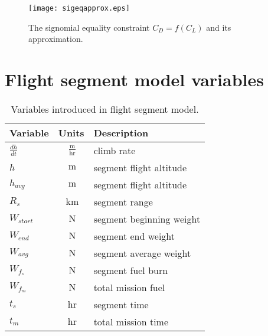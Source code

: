 \begin{figure}[!ht]
\centering
\texttt{[image: sigeqapprox.eps]}
\caption{The signomial equality constraint $C_{D} = f(C_{L})$ and its
approximation.}\label{f:sigeq}
\end{figure}

\section{Flight segment model variables}
\label{a:flightprofilevars}

\begin{footnotesize}
    \begin{table}
        \centering
        \begin{tabular}{l c l}
            \toprule
            Variable & Units & Description \\
            \midrule
            $\frac{dh}{dt}$  & $~\mathrm{\tfrac{m}{hr}}$ & climb rate \\
            $h$ & $~\mathrm{m}$ & segment flight altitude\\
            $h_{avg}$ & $~\mathrm{m}$ & segment flight altitude\\
            $R_s$ & $~\mathrm{km}$ & segment range\\
            $W_{start}$  & $~\mathrm{N}$ & segment beginning weight\\
            $W_{end}$ & $~\mathrm{N}$ & segment end weight\\
            $W_{avg}$ & $~\mathrm{N}$ & segment average weight\\
            $W_{f_s}$ & $~\mathrm{N}$ & segment fuel burn\\
            $W_{f_m}$  & $~\mathrm{N}$ & total mission fuel\\
            $t_s$ & $~\mathrm{hr}$ & segment time\\
            $t_m$  & $~\mathrm{hr}$ & total mission time\\
            \bottomrule
        \end{tabular}
        \caption{Variables introduced in flight segment model.}
        \label{t:vars_flightprofile}
    \end{table}
\end{footnotesize}
